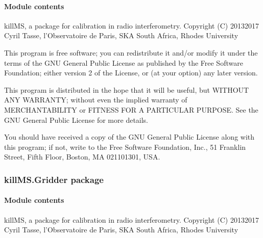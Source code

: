 \documentclass[letterpaper,10pt,english]{sphinxmanual}
\begin{document}
\paragraph{Module contents}
\label{\detokenize{api/killMS.Data:module-killMS.Data}}\label{\detokenize{api/killMS.Data:module-contents}}
\sphinxAtStartPar
killMS, a package for calibration in radio interferometry.
Copyright (C) 2013\sphinxhyphen{}2017  Cyril Tasse, l’Observatoire de Paris,
SKA South Africa, Rhodes University

\sphinxAtStartPar
This program is free software; you can redistribute it and/or
modify it under the terms of the GNU General Public License
as published by the Free Software Foundation; either version 2
of the License, or (at your option) any later version.

\sphinxAtStartPar
This program is distributed in the hope that it will be useful,
but WITHOUT ANY WARRANTY; without even the implied warranty of
MERCHANTABILITY or FITNESS FOR A PARTICULAR PURPOSE.  See the
GNU General Public License for more details.

\sphinxAtStartPar
You should have received a copy of the GNU General Public License
along with this program; if not, write to the Free Software
Foundation, Inc., 51 Franklin Street, Fifth Floor, Boston, MA  02110\sphinxhyphen{}1301, USA.

\sphinxstepscope


\subsubsection{killMS.Gridder package}
\label{\detokenize{api/killMS.Gridder:killms-gridder-package}}\label{\detokenize{api/killMS.Gridder::doc}}

\paragraph{Module contents}
\label{\detokenize{api/killMS.Gridder:module-killMS.Gridder}}\label{\detokenize{api/killMS.Gridder:module-contents}}
\sphinxAtStartPar
killMS, a package for calibration in radio interferometry.
Copyright (C) 2013\sphinxhyphen{}2017  Cyril Tasse, l’Observatoire de Paris,
SKA South Africa, Rhodes University
\end{document}
